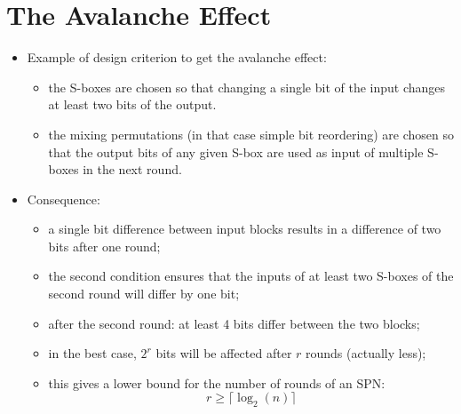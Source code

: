 \section{The Avalanche Effect}
	\begin{itemize}
	    \item Example of design criterion to get the avalanche effect:
	    \begin{itemize}
	        \item the S-boxes are chosen so that changing a single bit of the input changes at least two bits of the output.
	        \item the mixing permutations (in that case simple bit reordering) are chosen so that the output bits of any given S-box are used as input of multiple S-boxes in the next round.
	    \end{itemize}
	    \item Consequence:
	    \begin{itemize}
	        \item a single bit difference between input blocks results in a difference of two bits after one round;
	        \item the second condition ensures that the inputs of at least two S-boxes of the second round will differ by one bit;
	        \item after the second round: at least 4 bits differ between the two blocks;
	        \item in the best case, $2^r$ bits will be affected after $r$ rounds (actually less);
	        \item this gives a lower bound for the number of rounds of an SPN: $$r \geq \lceil \log_2(n) \rceil$$
	    \end{itemize}
	\end{itemize}


